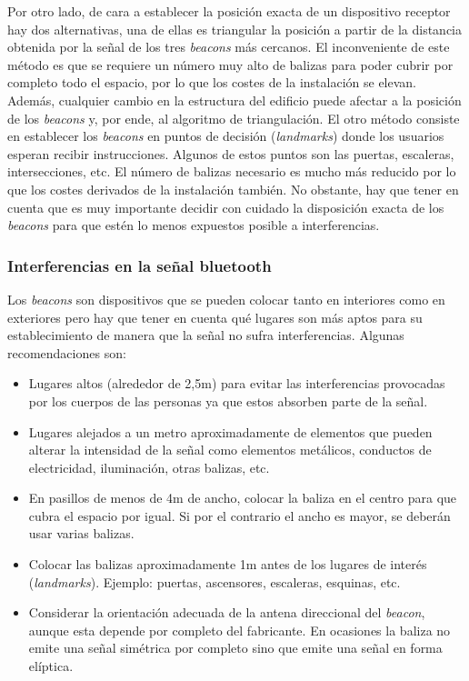 Por otro lado, de cara a establecer la posición exacta de un dispositivo receptor hay dos alternativas, una de ellas es triangular la posición a partir de la distancia obtenida por la señal de los tres \textit{beacons} más cercanos. El inconveniente de este método es que se requiere un número muy alto de balizas para poder cubrir por completo todo el espacio, por lo que los costes de la instalación se elevan. Además, cualquier cambio en la estructura del edificio puede afectar a la posición de los \textit{beacons} y, por ende, al algoritmo de triangulación. El otro método consiste en establecer los \textit{beacons} en puntos de decisión (\textit{landmarks}) donde los usuarios esperan recibir instrucciones. Algunos de estos puntos son las puertas, escaleras, intersecciones, etc. El número de balizas necesario es mucho más reducido por lo que los costes derivados de la instalación también. No obstante, hay que tener en cuenta que es muy importante decidir con cuidado la disposición exacta de los \textit{beacons} para que estén lo menos expuestos posible a interferencias. 

\subsubsection{Interferencias en la señal bluetooth}
\label{sec:Interferencias}
Los \textit{beacons} son dispositivos que se pueden colocar tanto en interiores como en exteriores pero hay que tener en cuenta qué lugares son más aptos para su establecimiento de manera que la señal no sufra interferencias. Algunas recomendaciones son:
\begin{itemize}
	\item Lugares altos (alrededor de 2,5m) para evitar las interferencias provocadas por los cuerpos de las personas ya que estos absorben parte de la señal.
	\item Lugares alejados a un metro aproximadamente de elementos que pueden alterar la intensidad de la señal como elementos metálicos, conductos de electricidad, iluminación, otras balizas, etc.
	\item En pasillos de menos de 4m de ancho, colocar la baliza en el centro para que cubra el espacio por igual. Si por el contrario el ancho es mayor, se deberán usar varias balizas.
	\item Colocar las balizas aproximadamente 1m antes de los lugares de interés (\textit{landmarks}). Ejemplo: puertas, ascensores, escaleras, esquinas, etc.
	\item Considerar la orientación adecuada de la antena direccional del \textit{beacon}, aunque esta depende por completo del fabricante. En ocasiones la baliza no emite una señal simétrica por completo sino que emite una señal en forma elíptica.
\end{itemize}

